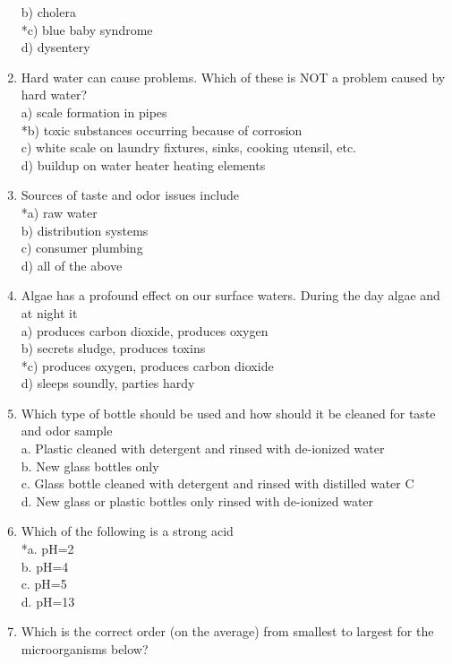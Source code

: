 \begin{enumerate}[1.]
b) cholera\\
*c) blue baby syndrome\\
d) dysentery\\
\item Hard water can cause problems. Which of these is NOT a problem caused by hard water?\\
a) scale formation in pipes\\
*b) toxic substances occurring because of corrosion\\
c) white scale on laundry fixtures, sinks, cooking utensil, etc.\\
d) buildup on water heater heating elements\\
\item Sources of taste and odor issues include\\
*a) raw water\\
b) distribution systems\\
c) consumer plumbing\\
d) all of the above\\
\item Algae has a profound effect on our surface waters. During the day algae and at night it\\
a) produces carbon dioxide, produces oxygen\\
b) secrets sludge, produces toxins\\
*c) produces oxygen, produces carbon dioxide\\
d) sleeps soundly, parties hardy\\
\item Which type of bottle should be used and how should it be cleaned for taste and odor sample\\
a.  Plastic cleaned with detergent and rinsed with de-ionized water\\
b.  New glass bottles only\\
c.  Glass bottle cleaned with detergent and rinsed with distilled water C\\
d.  New glass or plastic bottles only rinsed with de-ionized water\\
\item Which of the following is a strong acid\\
*a.  pH=2\\
b.  pH=4\\
c.  pH=5\\
d.  pH=13\\
\item Which is the correct order (on the average) from smallest to largest for the microorganisms below?\\

\end{enumerate}
